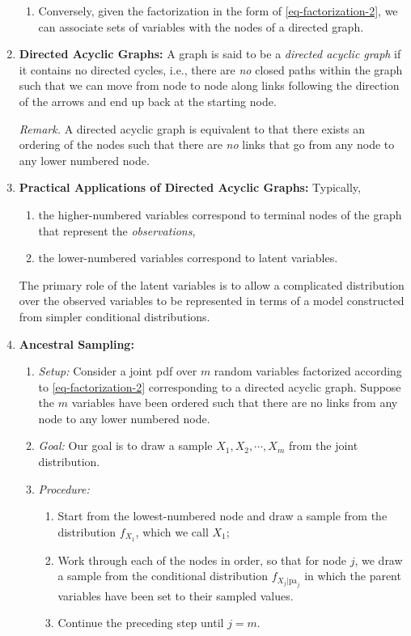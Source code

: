 \documentclass[12pt]{article}
\begin{document}
\begin{enumerate}[label=\textbf{\arabic*.}]
\begin{enumerate}
		\item Conversely, given the factorization in the form of \eqref{eq-factorization-2}, we can associate sets of variables with the nodes of a directed graph. 
	
	\end{enumerate}
	
	\item \textbf{Directed Acyclic Graphs:} A graph is said to be a \textit{directed acyclic graph} if it contains no directed cycles, i.e., there are \emph{no} closed paths within the graph such that we can move from node to node along links following the direction of the arrows and end up back at the starting node. 
	
	\textit{Remark.} A directed acyclic graph is equivalent to that there exists an ordering of the nodes such that there are \emph{no} links that go from any node to any lower numbered node. 
	
	\item \textbf{Practical Applications of Directed Acyclic Graphs:} Typically, 
	\begin{enumerate}
		\item the higher-numbered variables correspond to terminal nodes of the graph that represent the \emph{observations}, 
		\item the lower-numbered variables correspond to latent variables. 
	\end{enumerate}
	The primary role of the latent variables is to allow a complicated distribution over the observed variables to be represented in terms of a model constructed from simpler conditional distributions. 

	\item \textbf{Ancestral Sampling:} 
	\begin{enumerate}
		
		\item \textit{Setup:} Consider a joint pdf over $m$ random variables factorized according to \eqref{eq-factorization-2} corresponding to a directed acyclic graph. Suppose the $m$ variables have been ordered such that there are no links from any node to any lower numbered node. 
		
		\item \textit{Goal:} Our goal is to draw a sample $X_1, X_2, \cdots, X_m$ from the joint distribution. 
		
		\item \textit{Procedure:} 
		\begin{enumerate}
			\item Start from the lowest-numbered node and draw a sample from the distribution $f_{X_1}$, which we call $X_1$; 
			\item Work through each of the nodes in order, so that for node $j$, we draw a sample from the conditional distribution $f_{X_j \vert \mathrm{pa}_j}$ in which the parent variables have been set to their sampled values. 
			\item Continue the preceding step until $j = m$. 
		\end{enumerate}
		

\end{enumerate}
\end{enumerate}
\end{document}
